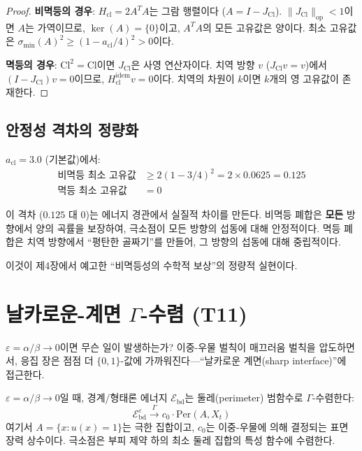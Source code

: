 \begin{proof}
\textbf{비멱등의 경우}: $H_{\mathrm{cl}} = 2A^T A$는 그람 행렬이다 ($A = I - J_{\mathrm{Cl}}$). $\|J_{\mathrm{Cl}}\|_{\mathrm{op}} < 1$이면 $A$는 가역이므로, $\ker(A) = \{0\}$이고, $A^T A$의 모든 고유값은 양이다. 최소 고유값은 $\sigma_{\min}(A)^2 \geq (1 - a_{\mathrm{cl}}/4)^2 > 0$이다.

\textbf{멱등의 경우}: $\mathrm{Cl}^2 = \mathrm{Cl}$이면 $J_{\mathrm{Cl}}$은 사영 연산자이다. 치역 방향 $v$ ($J_{\mathrm{Cl}} v = v$)에서 $(I - J_{\mathrm{Cl}})v = 0$이므로, $H_{\mathrm{cl}}^{\mathrm{idem}} v = 0$이다. 치역의 차원이 $k$이면 $k$개의 영 고유값이 존재한다.
\end{proof}

\subsection{안정성 격차의 정량화}

$a_{\mathrm{cl}} = 3.0$ (기본값)에서:
\begin{align}
    \text{비멱등 최소 고유값} &\geq 2(1 - 3/4)^2 = 2 \times 0.0625 = 0.125 \\
    \text{멱등 최소 고유값} &= 0
\end{align}

이 격차 ($0.125$ 대 $0$)는 에너지 경관에서 실질적 차이를 만든다. 비멱등 폐합은 \textbf{모든} 방향에서 양의 곡률을 보장하여, 극소점이 모든 방향의 섭동에 대해 안정적이다. 멱등 폐합은 치역 방향에서 ``평탄한 골짜기''를 만들어, 그 방향의 섭동에 대해 중립적이다.

이것이 제4장에서 예고한 ``비멱등성의 수학적 보상''의 정량적 실현이다.


\section{날카로운-계면 $\Gamma$-수렴 (T11)}
\label{sec:gamma-convergence}

$\varepsilon = \alpha/\beta \to 0$이면 무슨 일이 발생하는가? 이중-우물 벌칙이 매끄러움 벌칙을 압도하면서, 응집 장은 점점 더 $\{0, 1\}$-값에 가까워진다---``날카로운 계면(sharp interface)''에 접근한다.

\begin{theorem}[T11: $\Gamma$-수렴]
\label{thm:gamma-convergence}
$\varepsilon = \alpha/\beta \to 0$일 때, 경계/형태론 에너지 $\mathcal{E}_{\mathrm{bd}}$는 둘레(perimeter) 범함수로 $\Gamma$-수렴한다:
\begin{equation}
    \mathcal{E}_{\mathrm{bd}}^\varepsilon \xrightarrow{\Gamma} c_0 \cdot \mathrm{Per}(A, X_t)
    \label{eq:gamma-convergence}
\end{equation}
여기서 $A = \{x : u(x) = 1\}$는 극한 집합이고, $c_0$는 이중-우물에 의해 결정되는 표면 장력 상수이다. 극소점은 부피 제약 하의 최소 둘레 집합의 특성 함수에 수렴한다.
\end{theorem}

